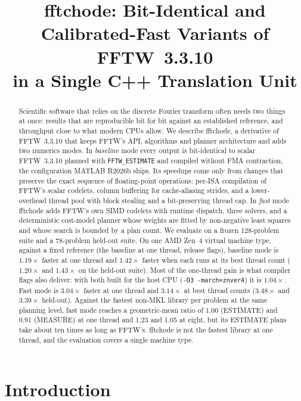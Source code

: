 \documentclass[10pt]{article}
\title{fftchode: Bit-Identical and Calibrated-Fast Variants of FFTW~3.3.10\\in a Single C++ Translation Unit}
\author{}
\date{}
\theoremstyle{definition}
\begin{document}
\maketitle

\begin{abstract}
Scientific software that relies on the discrete Fourier transform often needs two things at once: results that are reproducible bit for bit against an established reference, and throughput close to what modern CPUs allow. We describe fftchode, a derivative of FFTW~3.3.10 that keeps FFTW's API, algorithms and planner architecture and adds two numerics modes. In \emph{baseline} mode every output is bit-identical to scalar FFTW~3.3.10 planned with \texttt{FFTW\_ESTIMATE} and compiled without FMA contraction, the configuration MATLAB R2026b ships. Its speedups come only from changes that preserve the exact sequence of floating-point operations: per-ISA compilation of FFTW's scalar codelets, column buffering for cache-aliasing strides, and a lower-overhead thread pool with block stealing and a bit-preserving thread cap. In \emph{fast} mode fftchode adds FFTW's own SIMD codelets with runtime dispatch, three solvers, and a deterministic cost-model planner whose weights are fitted by non-negative least squares and whose search is bounded by a plan count. We evaluate on a frozen 128-problem suite and a 78-problem held-out suite.
On one AMD Zen~4 virtual machine type, against a fixed reference (the baseline at one thread, release flags), baseline mode is $1.19\times$ faster at one thread and $1.42\times$ faster when each runs at its best thread count ($1.20\times$ and $1.43\times$ on the held-out suite). Most of the one-thread gain is what compiler flags also deliver: with both built for the host CPU (\texttt{-O3 -march=znver4}) it is $1.04\times$. Fast mode is $3.04\times$ faster at one thread and $3.14\times$ at best thread counts ($3.48\times$ and $3.39\times$ held-out). Against the fastest non-MKL library per problem at the same planning level, fast mode reaches a geometric-mean ratio of 1.00 (ESTIMATE) and 0.91 (MEASURE) at one thread and 1.23 and 1.05 at eight, but its ESTIMATE plans take about ten times as long as FFTW's. fftchode is not the fastest library at one thread, and the evaluation covers a single machine type.
\end{abstract}

\section{Introduction}
\end{document}
